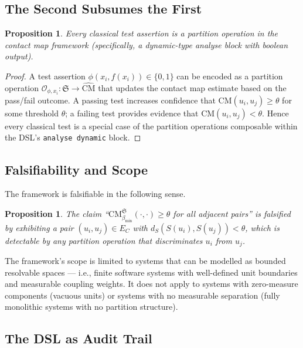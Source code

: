 \documentclass[12pt,a4paper,twocolumn]{article}
\theoremstyle{plain}
\newtheorem{proposition}[theorem]{Proposition}
\theoremstyle{definition}
\theoremstyle{remark}
\newcommand{\CM}{\mathrm{CM}}
\newcommand{\bmin}{\beta_{\min}}
\newcommand{\dS}{d_S}
\newcommand{\CMbmin}{\CM_{\bmin}}
\begin{document}
\subsection{The Second Subsumes the First}

\begin{proposition}
Every classical test assertion is a partition operation in the contact map
framework (specifically, a dynamic-type analyse block with boolean output).
\end{proposition}

\begin{proof}
A test assertion $\phi(x_i, f(x_i)) \in \{0,1\}$ can be encoded as a
partition operation $\mathcal{O}_{\phi,x_i} : \mathfrak{S} \to \hat{\CM}$
that updates the contact map estimate based on the pass/fail outcome.  A
passing test increases confidence that $\CM(u_i, u_j) \geq \theta$ for some
threshold $\theta$; a failing test provides evidence that $\CM(u_i, u_j) <
\theta$.  Hence every classical test is a special case of the partition
operations composable within the DSL's \texttt{analyse dynamic} block.
\end{proof}

\subsection{Falsifiability and Scope}

The framework is falsifiable in the following sense.

\begin{proposition}
The claim ``$\CMbmin^\mathfrak{S}(\cdot, \cdot) \geq \theta$ for all adjacent
pairs'' is falsified by exhibiting a pair $(u_i, u_j) \in E_C$ with
$\dS(S(u_i), S(u_j)) < \theta$, which is detectable by any partition
operation that discriminates $u_i$ from $u_j$.
\end{proposition}

The framework's scope is limited to systems that can be modelled as bounded
resolvable spaces --- i.e., finite software systems with well-defined unit
boundaries and measurable coupling weights.  It does not apply to systems with
zero-measure components (vacuous units) or systems with no measurable
separation (fully monolithic systems with no partition structure).

\subsection{The DSL as Audit Trail}
\end{document}
